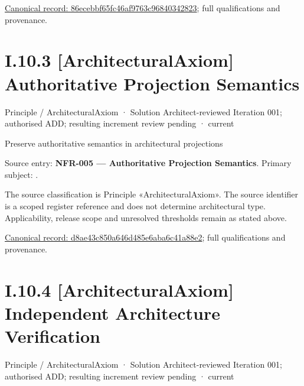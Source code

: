 {\footnotesize \href{../../../../../../../../continuum/motivation/principle/architectural-axiom/86ecebbf65fc46af9763c96840342823.md}{Canonical record: 86ecebbf65fc46af9763c96840342823}; full qualifications and provenance.}\par
\section*{I.10.3 [ArchitecturalAxiom] Authoritative Projection Semantics}
\label{navigation:I.10.3}

\label{element:d8ae43c850a646d485e6aba6c41a88e2}
{\small Principle / ArchitecturalAxiom · Solution Architect-reviewed Iteration 001; authorised ADD; resulting increment review pending · current}\par

Preserve authoritative semantics in architectural projections



Source entry: \textbf{NFR-005 — Authoritative Projection Semantics}. Primary subject: \texttt{}.



The source classification is Principle «ArchitecturalAxiom». The source identifier is a scoped register reference and does not determine architectural type. Applicability, release scope and unresolved thresholds remain as stated above.


{\footnotesize \href{../../../../../../../../continuum/motivation/principle/architectural-axiom/d8ae43c850a646d485e6aba6c41a88e2.md}{Canonical record: d8ae43c850a646d485e6aba6c41a88e2}; full qualifications and provenance.}\par
\section*{I.10.4 [ArchitecturalAxiom] Independent Architecture Verification}
\label{navigation:I.10.4}

\label{element:82d29abf230d478aaf42ecb73ecbd01e}
{\small Principle / ArchitecturalAxiom · Solution Architect-reviewed Iteration 001; authorised ADD; resulting increment review pending · current}\par


